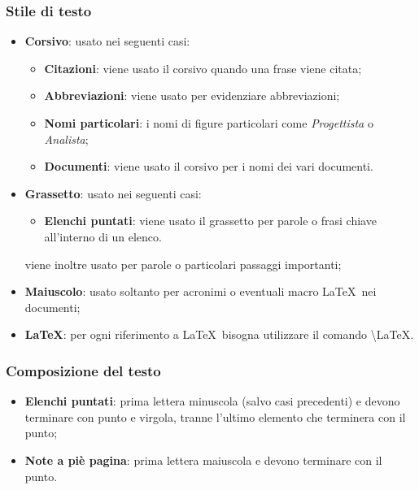 \documentclass[../NormeDiProgetto.tex]{subfiles}
\begin{document}
		\subsubsection{Stile di testo}
		\begin{itemize}
			\item \textbf{Corsivo}: usato nei seguenti casi:
			\begin{itemize}
				\item \textbf{Citazioni}: viene usato il corsivo quando una frase viene citata;
				\item \textbf{Abbreviazioni}: viene usato per evidenziare abbreviazioni;  
				\item \textbf{Nomi particolari}: i nomi di figure particolari come \textit{Progettista} o \textit{Analista};  
				\item \textbf{Documenti}: viene usato il corsivo per i nomi dei vari documenti.
			\end{itemize}
			
			\item \textbf{Grassetto}: usato nei seguenti casi:
			\begin{itemize}
				\item \textbf{Elenchi puntati}: viene usato il grassetto per parole o frasi chiave all'interno di un elenco.
				
			\end{itemize}			
			viene inoltre usato per parole o particolari passaggi importanti;
			\item \textbf{Maiuscolo}: usato soltanto per acronimi o eventuali macro \LaTeX\ nei documenti;
			\item \textbf{\LaTeX }: per ogni riferimento a \LaTeX\ bisogna utilizzare il comando \textbackslash LaTeX.
			
		\end{itemize}
		
		\subsubsection{Composizione del testo}
		\begin{itemize}
			\item \textbf{Elenchi puntati}: prima lettera minuscola (salvo casi precedenti) e devono terminare con punto e virgola, tranne l'ultimo elemento che terminera con il punto;
			\item \textbf{Note a piè pagina}: prima lettera maiuscola e devono terminare con il punto.
		\end{itemize}
\end{document}
